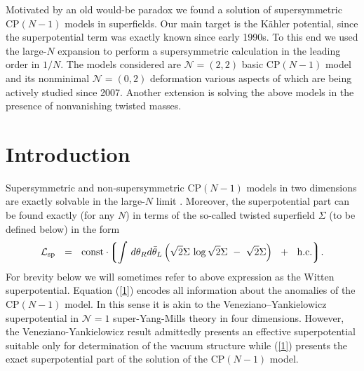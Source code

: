 \documentclass[epsfig,12pt]{article}
\def\beq{\begin{equation}}
\def\eeq{\end{equation}}
\newcommand{\lgr}{\left\lgroup}
\newcommand{\rgr}{\right\rgroup}
\begin{document}
\begin{titlepage}
\hspace{0.3cm}

	Motivated by an old would-be paradox we found a solution of supersymmetric CP$(N-1)$ models in superfields.
	Our main target is the  K\"ahler potential, since the superpotential term was exactly known since early 1990s.
	To this end we used the large-$N$ expansion to 
	perform a supersymmetric calculation in the leading order in $1/N$. 
	The models considered are ${\mathcal N}= (2,2)$ basic CP$(N-1)$ model and  its nonminimal ${\mathcal N}= (0,2)$ 
	deformation various aspects of which are being actively studied since 2007. 
	Another extension  is solving the above models in the presence of 
	nonvanishing twisted masses. 
\vspace{2cm}


\end{titlepage}


\section{Introduction}
\label{sec1}

	Supersymmetric and non-supersymmetric CP$(N-1)$ models in two dimensions are exactly solvable in the large-$N$ limit \cite{0,1p,SYhet}. 
	Moreover, the superpotential part can be found exactly (for any $N$) \cite{1,2,3} in terms of the so-called 
	twisted superfield $\Sigma$ (to be defined below) in the form
\beq
	{\mathcal L}_{\rm sp}    ~~=~~    \text{const} \cdot \!\lgr \int\, 
		d\theta_Rd\bar\theta_L \left( \sqrt{2}\Sigma\, \log \sqrt{2}\Sigma ~-~  
					      \sqrt{2}\Sigma \right) ~~+~~ \text{h.c.}\rgr\!.
\label{1}
\eeq
	For brevity below we will sometimes refer to above expression as the Witten superpotential.
	Equation (\ref{1})  encodes all information about the anomalies of the CP$(N-1)$ model. 
	In this sense it is akin to the Veneziano--Yankielowicz superpotential \cite{Veneziano} in ${\mathcal N}=1$ 
	super-Yang-Mills theory in four dimensions. 
	However, the Veneziano-Yankielowicz result admittedly presents an effective superpotential 
	suitable only for determination of the vacuum structure while (\ref{1}) presents the exact 
	superpotential part of the solution of the CP$(N-1)$ model.
\end{document}

